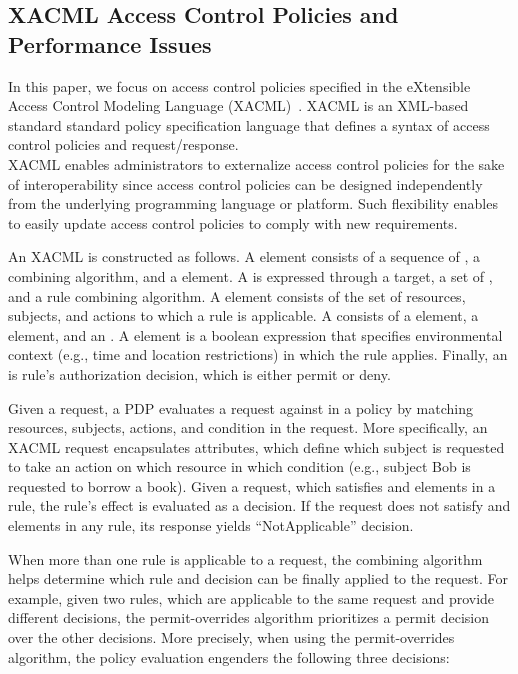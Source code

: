 \subsection{XACML Access Control Policies and Performance Issues}

In this paper, we focus on access control policies specified in the eXtensible Access Control Modeling Language (XACML)~\cite{sunxacml}.
XACML is an XML-based standard standard policy specification language that defines a syntax of access control policies and
request/response. \\XACML enables administrators to externalize access control policies for the sake of interoperability since access control policies can be designed 
independently from the underlying programming language or platform. Such flexibility enables to easily update access control policies to comply with new requirements.

An XACML is constructed as follows.
A  element consists of a sequence of , a combining algorithm, and
a  element. A  is expressed through a target, a set of , and a rule combining algorithm. 
A  element consists of the set of resources, subjects, and actions to which a rule is applicable. A  consists of a 
 element, a  element, and an . A  element is a boolean expression that specifies 
environmental context (e.g., time and location restrictions) in which the rule applies.
Finally, an  is rule's authorization decision, which is either permit or deny.

Given a request, a PDP evaluates a request against  in a policy by matching resources, subjects, actions, and condition in the request.
More specifically, an XACML request encapsulates attributes, which define which subject is requested to take an action on which resource in which
condition (e.g., subject Bob is requested to borrow a book).
Given a request, which satisfies  and  elements in a rule, the rule's effect
is evaluated as a decision.
If the request does not satisfy  and  elements in any rule, its response yields ``NotApplicable'' decision.

When more than one rule is applicable to a request, the combining algorithm helps determine which rule and decision can be finally
applied to the request.
For example, given two rules, which are applicable to the same request and provide different decisions,
the permit-overrides algorithm prioritizes a permit decision over the other decisions.
More precisely, when using the permit-overrides algorithm, the policy evaluation engenders the following three decisions: 

